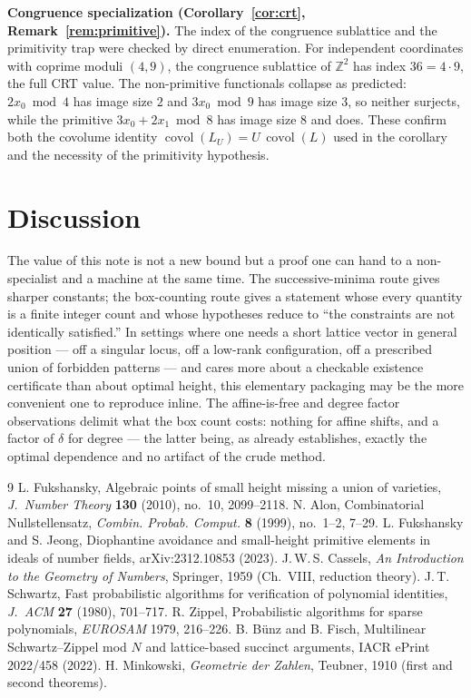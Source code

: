 \documentclass[11pt]{article}
\theoremstyle{definition}
\newcommand{\Z}{\mathbb{Z}}
\DeclareMathOperator{\covol}{covol}
\begin{document}
\medskip
\noindent\textbf{Congruence specialization (Corollary~\ref{cor:crt},
Remark~\ref{rem:primitive}).} The index of the congruence sublattice and the
primitivity trap were checked by direct enumeration. For independent coordinates with
coprime moduli $(4,9)$, the congruence sublattice of $\Z^2$ has index $36 = 4\cdot 9$,
the full CRT value. The non-primitive functionals collapse as predicted: $2x_0 \bmod 4$
has image size $2$ and $3x_0 \bmod 9$ has image size $3$, so neither surjects, while the
primitive $3x_0 + 2x_1 \bmod 8$ has image size $8$ and does. These confirm both the
covolume identity $\covol(L_U) = U\,\covol(L)$ used in the corollary and the necessity
of the primitivity hypothesis.

\section{Discussion}

The value of this note is not a new bound but a proof one can hand to a non-specialist
and a machine at the same time. The successive-minima route gives sharper constants;
the box-counting route gives a statement whose every quantity is a finite integer count
and whose hypotheses reduce to ``the constraints are not identically satisfied.'' In
settings where one needs a short lattice vector in general position --- off a singular
locus, off a low-rank configuration, off a prescribed union of forbidden patterns --- and
cares more about a checkable existence certificate than about optimal height, this
elementary packaging may be the more convenient one to reproduce inline. The
affine-is-free and degree factor observations delimit what the box count costs: nothing
for affine shifts, and a factor of $\delta$ for degree --- the latter being, as
\cite{fuk2010} already establishes, exactly the optimal dependence and no artifact of the
crude method.

\begin{thebibliography}{9}
 L. Fukshansky, Algebraic points of small height missing a union of
varieties, \emph{J.~Number Theory} \textbf{130} (2010), no.~10, 2099--2118.
 N. Alon, Combinatorial Nullstellensatz, \emph{Combin. Probab. Comput.}
\textbf{8} (1999), no.~1--2, 7--29.
 L. Fukshansky and S. Jeong, Diophantine avoidance and small-height
primitive elements in ideals of number fields, arXiv:2312.10853 (2023).
 J.\,W.\,S. Cassels, \emph{An Introduction to the Geometry of Numbers},
Springer, 1959 (Ch.~VIII, reduction theory).
 J.\,T. Schwartz, Fast probabilistic algorithms for verification of
polynomial identities, \emph{J.~ACM} \textbf{27} (1980), 701--717.
 R. Zippel, Probabilistic algorithms for sparse polynomials,
\emph{EUROSAM} 1979, 216--226.
 B. B\"unz and B. Fisch, Multilinear Schwartz--Zippel mod $N$
and lattice-based succinct arguments, IACR ePrint 2022/458 (2022).
 H. Minkowski, \emph{Geometrie der Zahlen}, Teubner, 1910 (first and
second theorems).
\end{thebibliography}
\end{document}
